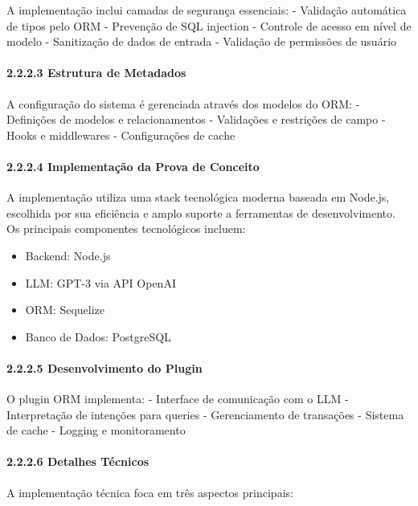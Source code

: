 \documentclass[
]{article}
\providecommand{\tightlist}{%
  \setlength{\itemsep}{0pt}\setlength{\parskip}{0pt}}
\begin{document}
A implementação inclui camadas de segurança essenciais: - Validação
automática de tipos pelo ORM - Prevenção de SQL injection - Controle de
acesso em nível de modelo - Sanitização de dados de entrada - Validação
de permissões de usuário

\paragraph{2.2.2.3 Estrutura de Metadados}\label{estrutura-de-metadados}

A configuração do sistema é gerenciada através dos modelos do ORM: -
Definições de modelos e relacionamentos - Validações e restrições de
campo - Hooks e middlewares - Configurações de cache

\paragraph{2.2.2.4 Implementação da Prova de
Conceito}\label{implementauxe7uxe3o-da-prova-de-conceito}

A implementação utiliza uma stack tecnológica moderna baseada em
Node.js, escolhida por sua eficiência e amplo suporte a ferramentas de
desenvolvimento. Os principais componentes tecnológicos incluem:

\begin{itemize}
\tightlist
\item
  Backend: Node.js
\item
  LLM: GPT-3 via API OpenAI
\item
  ORM: Sequelize
\item
  Banco de Dados: PostgreSQL
\end{itemize}

\paragraph{2.2.2.5 Desenvolvimento do
Plugin}\label{desenvolvimento-do-plugin}

O plugin ORM implementa: - Interface de comunicação com o LLM -
Interpretação de intenções para queries - Gerenciamento de transações -
Sistema de cache - Logging e monitoramento

\paragraph{2.2.2.6 Detalhes Técnicos}\label{detalhes-tuxe9cnicos}

A implementação técnica foca em três aspectos principais:
\end{document}
